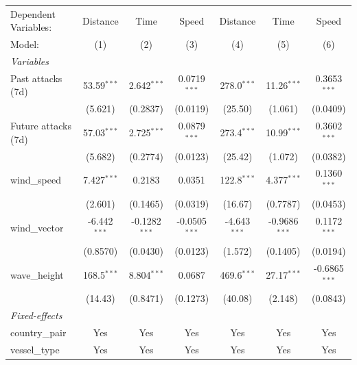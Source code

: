 \begingroup
\centering
\begin{tabular}{lcccccc}
   \tabularnewline \midrule \midrule
   Dependent Variables: & Distance       & Time            & Speed           & Distance       & Time            & Speed\\  
   Model:               & (1)            & (2)             & (3)             & (4)            & (5)             & (6)\\  
   \midrule
   \emph{Variables}\\
   Past attacks (7d)    & 53.59$^{***}$  & 2.642$^{***}$   & 0.0719$^{***}$  & 278.0$^{***}$  & 11.26$^{***}$   & 0.3653$^{***}$\\   
                        & (5.621)        & (0.2837)        & (0.0119)        & (25.50)        & (1.061)         & (0.0409)\\   
   Future attacks (7d)  & 57.03$^{***}$  & 2.725$^{***}$   & 0.0879$^{***}$  & 273.4$^{***}$  & 10.99$^{***}$   & 0.3602$^{***}$\\   
                        & (5.682)        & (0.2774)        & (0.0123)        & (25.42)        & (1.072)         & (0.0382)\\   
   wind\_speed          & 7.427$^{***}$  & 0.2183          & 0.0351          & 122.8$^{***}$  & 4.377$^{***}$   & 0.1360$^{***}$\\   
                        & (2.601)        & (0.1465)        & (0.0319)        & (16.67)        & (0.7787)        & (0.0453)\\   
   wind\_vector         & -6.442$^{***}$ & -0.1282$^{***}$ & -0.0505$^{***}$ & -4.643$^{***}$ & -0.9686$^{***}$ & 0.1172$^{***}$\\   
                        & (0.8570)       & (0.0430)        & (0.0123)        & (1.572)        & (0.1405)        & (0.0194)\\   
   wave\_height         & 168.5$^{***}$  & 8.804$^{***}$   & 0.0687          & 469.6$^{***}$  & 27.17$^{***}$   & -0.6865$^{***}$\\   
                        & (14.43)        & (0.8471)        & (0.1273)        & (40.08)        & (2.148)         & (0.0843)\\   
   \midrule
   \emph{Fixed-effects}\\
   country\_pair        & Yes            & Yes             & Yes             & Yes            & Yes             & Yes\\  
   vessel\_type         & Yes            & Yes             & Yes             & Yes            & Yes             & Yes\\  

\end{tabular}
